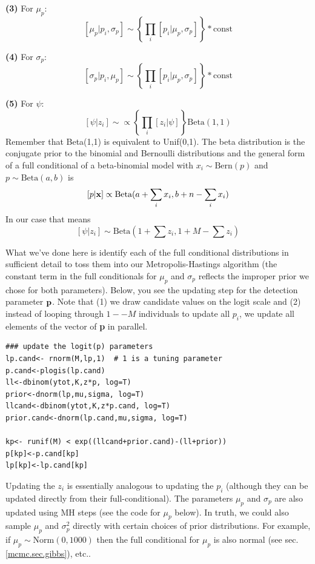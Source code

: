 {\bf (3)} For $\mu_{p}$:
\[
[\mu_{p} | p_{i}, \sigma_{p}] \sim \left\{ \prod_{i} [p_{i}|\mu_{p}, \sigma_{p}] \right\} *\mbox{const}
\]

{\bf (4)} For $\sigma_{p}$:
\[
[ \sigma_{p}|p_{i}, \mu_{p} ] \sim \left\{ \prod_{i}[p_{i}| \mu_{p},\sigma_{p} ] \right\} *\mbox{const}
\]

{\bf (5)} For $\psi$:
\[
[\psi|z_{i}] \sim \propto \left\{ \prod_{i} [z_{i}|\psi] \right\} \mbox{Beta}(1,1)
\]
Remember that \mbox{Beta}(1,1) is equivalent to \mbox{Unif}(0,1). The beta distribution is the conjugate prior to the binomial and 
Bernoulli distributions and the general form of a full conditional of a beta-binomial model 
with $x_{i} \sim \mbox{Bern} (p) $ and $p \sim \mbox{Beta}(a,b)$ is
\[
[p|{\bf x}] \propto \mbox{Beta}(a + \sum_i x_i, b + n-\sum_i x_i)
\]
In our case that means
\[
[\psi|z_{i}] \sim \mbox{Beta}(1 + \sum z_{i}, 1 + M - \sum z_{i})
\]

What we've done here is identify each of the full conditional
distributions in sufficient detail to toss them into our
Metropolis-Hastings algorithm (the constant term in the full
conditionals for $\mu_{p}$ and $\sigma_{p}$ reflects the improper
prior we chose for both parameters).  Below, you see the updating step
for the detection parameter ${\bf p}$. Note that (1) we draw candidate
values on the logit scale and (2) instead of looping through $1 -- M$
individuals to update all $p_{i}$, we update all elements of the
vector of {\bf p} in parallel.

\begin{verbatim}
### update the logit(p) parameters
lp.cand<- rnorm(M,lp,1)  # 1 is a tuning parameter
p.cand<-plogis(lp.cand)
ll<-dbinom(ytot,K,z*p, log=T)
prior<-dnorm(lp,mu,sigma, log=T)
llcand<-dbinom(ytot,K,z*p.cand, log=T)
prior.cand<-dnorm(lp.cand,mu,sigma, log=T)

kp<- runif(M) < exp((llcand+prior.cand)-(ll+prior))
p[kp]<-p.cand[kp]
lp[kp]<-lp.cand[kp]
\end{verbatim}

Updating the $z_{i}$ is essentially analogous to updating the $p_{i}$
(although they can be updated directly from their
full-conditional). The parameters $\mu_{p}$ and $\sigma_{p}$ are also updated using MH steps (see the code for $\mu_{p}$ below). In truth, we could also sample $\mu_{p}$
and $\sigma_{p}^{2}$ directly with certain choices of prior
distributions. For example, if $\mu_{p} \sim \mbox{Norm}(0, 1000)$
then the full conditional for $\mu_{p}$ is also normal (see
sec. \ref{mcmc.sec.gibbs}), etc..

